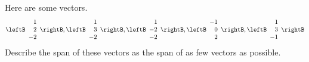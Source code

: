 \begin{enumialphparenastyle}
\begin{ex} Here are some vectors.
\begin{equation*}
\leftB 
\begin{array}{r}
1 \\ 
2 \\ 
-2
\end{array}
\rightB ,\leftB 
\begin{array}{r}
1 \\ 
3 \\ 
-2
\end{array}
\rightB ,\leftB 
\begin{array}{r}
1 \\ 
-2 \\ 
-2
\end{array}
\rightB ,\leftB 
\begin{array}{r}
-1 \\ 
0 \\ 
2
\end{array}
\rightB ,\leftB 
\begin{array}{r}
1 \\ 
3 \\ 
-1
\end{array}
\rightB
\end{equation*}
Describe the span of these vectors as the span of as few vectors as possible.
\end{ex}


\end{enumialphparenastyle}
